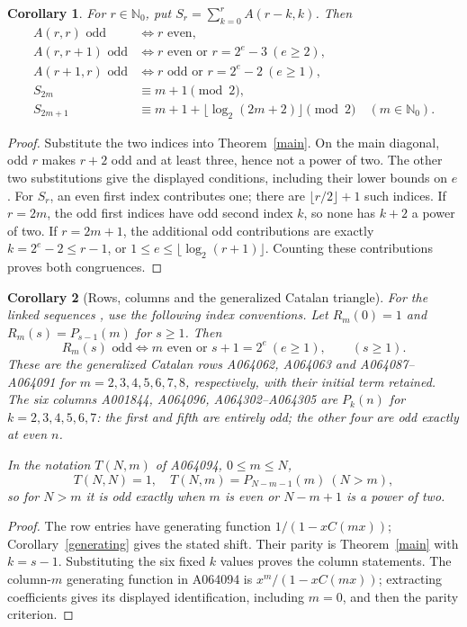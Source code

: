 \documentclass[11pt]{article}
\newtheorem{corollary}{Corollary}
\newcommand{\NN}{\mathbb N_0}
\begin{document}
\begin{corollary}\label{siblings}
For $r\in\NN$, put $S_r=\sum_{k=0}^r A(r-k,k)$. Then
\begin{align*}
 A(r,r)\text{ odd}&\iff r\text{ even},\\
 A(r,r+1)\text{ odd}&\iff r\text{ even or }r=2^e-3\ (e\ge2),\\
 A(r+1,r)\text{ odd}&\iff r\text{ odd or }r=2^e-2\ (e\ge1),\\
 S_{2m}&\equiv m+1\pmod2,\\
 S_{2m+1}&\equiv m+1+\lfloor\log_2(2m+2)\rfloor\pmod2\quad(m\in\NN).
\end{align*}
\end{corollary}
\begin{proof}
Substitute the two indices into Theorem~\ref{main}. On the main diagonal,
odd $r$ makes $r+2$ odd and at least three, hence not a power of two.
The other two substitutions give the displayed conditions, including
their lower bounds on $e$.
For $S_r$, an even first index contributes one; there are
$\lfloor r/2\rfloor+1$ such indices. If $r=2m$, the odd first indices
have odd second index $k$, so none has $k+2$ a power of two.
If $r=2m+1$, the additional odd contributions are exactly
$k=2^e-2\le r-1$, or $1\le e\le\lfloor\log_2(r+1)\rfloor$.
Counting these contributions proves both congruences.
\end{proof}

\begin{corollary}[Rows, columns and the generalized Catalan triangle]
\label{rows}
For the linked sequences \cite{rows}, use the following index conventions.
Let $R_m(0)=1$ and $R_m(s)=P_{s-1}(m)$ for $s\ge1$. Then
\[
 R_m(s)\text{ odd}\iff m\text{ even or }s+1=2^e\ (e\ge1),
 \qquad(s\ge1).
\]
These are the generalized Catalan rows A064062, A064063 and
A064087--A064091 for $m=2,3,4,5,6,7,8$, respectively, with their
initial term retained. The six columns A001844, A064096,
A064302--A064305 are $P_k(n)$ for $k=2,3,4,5,6,7$:
the first and fifth are entirely odd; the other four are odd exactly
at even $n$.

In the notation $T(N,m)$ of A064094, $0\le m\le N$,
\[
 T(N,N)=1,\quad T(N,m)=P_{N-m-1}(m)\ (N>m),
\]
so for $N>m$ it is odd exactly when $m$ is even or
$N-m+1$ is a power of two.
\end{corollary}
\begin{proof}
The row entries have generating function $1/(1-xC(mx))$;
Corollary~\ref{generating} gives the stated shift. Their parity is
Theorem~\ref{main} with $k=s-1$. Substituting the six fixed $k$ values
proves the column statements. The column-$m$ generating function in
A064094 is $x^m/(1-xC(mx))$; extracting coefficients gives its displayed
identification, including $m=0$, and then the parity criterion.
\end{proof}
\end{document}
